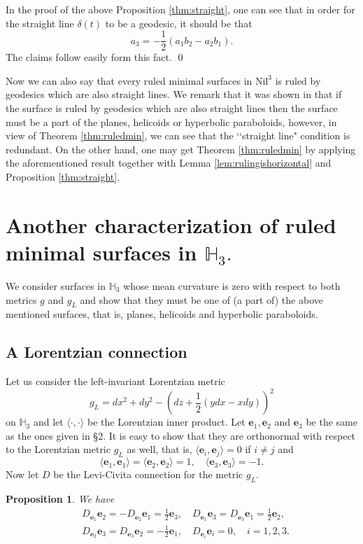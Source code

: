 \documentclass[11pt]{amsart}
\newtheorem{prop}{Proposition}[section]
\begin{document}
\noindent[Proof] In the proof of the above Proposition
\ref{thm:straight}, one can see that in order for the straight
line $\delta(t)$ to be a geodesic, it should be that
$$a_3=-\frac12(a_1b_2-a_2b_1).$$ The claims follow easily form this fact. \qed

\medskip

Now we can also say that every ruled minimal surfaces in
$\text{Nil}^3$ is ruled by geodesics which are also straight
lines. We remark that it was shown in \cite{BS} that if the
surface is ruled by geodesics which are also straight lines then
the surface must be a part of the planes, helicoids or hyperbolic
paraboloids, however, in view of Theorem {\ref{thm:ruledmin}}, we
can see that the \lq\lq straight line" condition is redundant. On
the other hand, one may get Theorem {\ref{thm:ruledmin}} by
applying the aforementioned result together with Lemma
\ref{lem:rulingishorizontal} and Proposition \ref{thm:straight}.

\section{Another characterization of ruled minimal surfaces in ${\mathbb{H}}_3.$}

We consider surfaces in ${\mathbb{H}}_3$ whose mean curvature is zero with
respect to both metrics $g$ and $g_L$ and show that they must be
one of (a part of) the above mentioned surfaces, that is, planes,
helicoids and hyperbolic paraboloids.

\subsection{A Lorentzian connection}
Let us consider the left-invariant Lorentzian metric
$$ g_L=dx^2+dy^2-\left(dz+\frac12(ydx-xdy)\right)^2$$
 on ${\mathbb{H}}_3$
and let $\langle\cdot,\cdot\rangle$ be the Lorentzian inner
product. Let ${\mathbf{e}}_1, {\mathbf{e}}_2$ and ${\mathbf{e}}_3$ be the same as the ones
given in \S 2. It is easy to show that they are orthonormal with
respect to the Lorentzian metric $g_L$ as well, that is, $\langle
{\mathbf{e}}_i, {\mathbf{e}}_j\rangle=0$ if $i\ne j$ and
$$
\langle{\mathbf{e}}_1, {\mathbf{e}}_1\rangle=\langle{\mathbf{e}}_2, {\mathbf{e}}_2\rangle=1,\quad
\langle{\mathbf{e}}_3, {\mathbf{e}}_3\rangle=-1.$$
 Now
let $D$ be the Levi-Civita connection for the metric $g_L.$

\begin{prop} We have
\[
\begin{split}
&D_{{\mathbf{e}}_1}{\mathbf{e}}_2=-D_{{\mathbf{e}}_2}{\mathbf{e}}_1=\frac12{\mathbf{e}}_3,\quad
D_{{\mathbf{e}}_1}{\mathbf{e}}_3=D_{{\mathbf{e}}_3}{\mathbf{e}}_1=\frac12{\mathbf{e}}_2,\\
&D_{{\mathbf{e}}_2}{\mathbf{e}}_3=D_{{\mathbf{e}}_3}{\mathbf{e}}_2=-\frac12{\mathbf{e}}_1,\quad
D_{{\mathbf{e}}_i}{\mathbf{e}}_i=0, \quad i=1,2,3.
\end{split}
\]
\end{prop}
\end{document}
